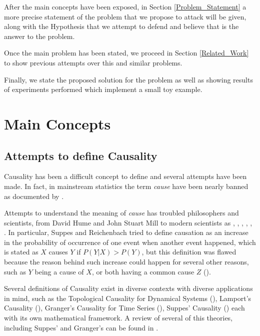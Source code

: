 \documentclass[english,letterpaper,12pt,final]{article}
\theoremstyle{definition}
\begin{document}
After the main concepts have been exposed, in Section \ref{Problem_Statement} a more precise statement of the problem that we propose to attack will be given, along with the Hypothesis that we attempt to defend and believe that is the answer to the problem.

Once the main problem has been stated, we proceed in Section \ref{Related_Work} to show previous attempts over this and similar problems. 

Finally, we state the proposed solution for the problem as well as showing results of experiments performed which implement a small toy example. 

\newpage
\section{Main Concepts}{\label{Main_Concepts}}
	\subsection{Attempts to define Causality}
	Causality has been a difficult concept to define and several attempts have been made. In fact, in mainstream statistics the term \textit{cause} have been nearly banned as documented by \cite{pearl2018why}.
	
Attempts to understand the meaning of \textit{cause} has troubled philosophers and scientists, from David Hume and John Stuart Mill to modern scientists as \cite{suppes1970probabilistic}, \cite{cartwright1983laws}, \cite{spirtes2000causation}, \cite{pearl2009causality}, \cite{spohn2012laws}, \cite{sep-causation-probabilistic}. In particular, Suppes and Reichenbach tried to define causation as an increase in the probability of occurrence of one event when another event happened, which is stated as $X$ causes $Y$ if $P(Y|X) > P(Y)$, but this definition was flawed because the reason behind such increase could happen for several other reasons, such as $Y$ being a cause of $X$, or both having a common cause $Z$ (\cite{pearl2018why}).

Several definitions of Causality exist in diverse contexts with diverse applications in mind, such as the Topological Causality for Dynamical Systems (\cite{harnack2017topological}), Lamport's Causality (\cite{lamport1978time}), Granger's Causality for Time Series (\cite{granger1969investigating}), Suppes' Causality (\cite{suppes1970probabilistic}) each with its own mathematical framework. A review of several of this theories, including Suppes' and Granger's can be found in \cite{holland1985statistics}.
	
\end{document}
